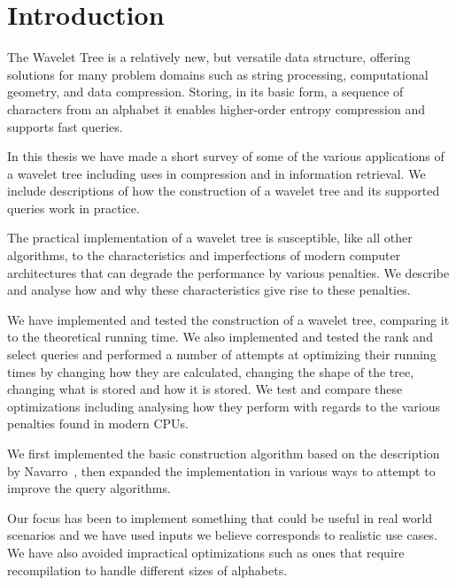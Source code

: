 \section{Introduction}
The Wavelet Tree is a relatively new, but versatile data structure, offering solutions for many problem domains such as string processing, computational geometry, and data compression.
Storing, in its basic form, a sequence of characters from an alphabet it enables higher-order entropy compression and supports fast queries.

In this thesis we have made a short survey of some of the various applications of a wavelet tree including uses in compression and in information retrieval.
We include descriptions of how the construction of a wavelet tree and its supported queries work in practice.

The practical implementation of a wavelet tree is susceptible, like all other algorithms, to the characteristics and imperfections of modern computer architectures that can degrade the performance by various penalties.
We describe and analyse how and why these characteristics give rise to these penalties.

We have implemented and tested the construction of a wavelet tree, comparing it to the theoretical running time.
We also implemented and tested the rank and select queries and performed a number of attempts at optimizing their running times by changing how they are calculated, changing the shape of the tree, changing what is stored and how it is stored.
We test and compare these optimizations including analysing how they perform with regards to the various penalties found in modern CPUs.

We first implemented the basic construction algorithm based on the description by Navarro~, then expanded the implementation in various ways to attempt to improve the query algorithms.

Our focus has been to implement something that could be useful in real world scenarios and we have used inputs we believe corresponds to realistic use cases.
We have also avoided impractical optimizations such as ones that require recompilation to handle different sizes of alphabets.